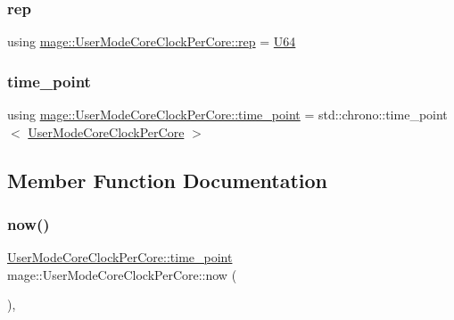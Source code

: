 \hypertarget{structmage_1_1_user_mode_core_clock_per_core_a287b38a7811aa8bb1a1829ac316acd09}{}\label{structmage_1_1_user_mode_core_clock_per_core_a287b38a7811aa8bb1a1829ac316acd09} 
\subsubsection{\texorpdfstring{rep}{rep}}
{\footnotesize\ttfamily using \hyperlink{structmage_1_1_user_mode_core_clock_per_core_a287b38a7811aa8bb1a1829ac316acd09}{mage\+::\+User\+Mode\+Core\+Clock\+Per\+Core\+::rep} =  \hyperlink{namespacemage_a6672cf3c861707ce4a3235a3eb43941d}{U64}}

\hypertarget{structmage_1_1_user_mode_core_clock_per_core_a52312b09168e0f4a8cace07d94be5427}{}\label{structmage_1_1_user_mode_core_clock_per_core_a52312b09168e0f4a8cace07d94be5427} 
\subsubsection{\texorpdfstring{time\+\_\+point}{time\_point}}
{\footnotesize\ttfamily using \hyperlink{structmage_1_1_user_mode_core_clock_per_core_a52312b09168e0f4a8cace07d94be5427}{mage\+::\+User\+Mode\+Core\+Clock\+Per\+Core\+::time\+\_\+point} =  std\+::chrono\+::time\+\_\+point$<$ \hyperlink{structmage_1_1_user_mode_core_clock_per_core}{User\+Mode\+Core\+Clock\+Per\+Core} $>$}



\subsection{Member Function Documentation}
\hypertarget{structmage_1_1_user_mode_core_clock_per_core_aa708031155400391c8b35ad206bd70b4}{}\label{structmage_1_1_user_mode_core_clock_per_core_aa708031155400391c8b35ad206bd70b4} 
\subsubsection{\texorpdfstring{now()}{now()}}
{\footnotesize\ttfamily \hyperlink{structmage_1_1_user_mode_core_clock_per_core_a52312b09168e0f4a8cace07d94be5427}{User\+Mode\+Core\+Clock\+Per\+Core\+::time\+\_\+point} mage\+::\+User\+Mode\+Core\+Clock\+Per\+Core\+::now (\begin{DoxyParamCaption}{ }\end{DoxyParamCaption})\hspace{0.3cm}{\ttfamily [static]}, {\ttfamily [noexcept]}}



